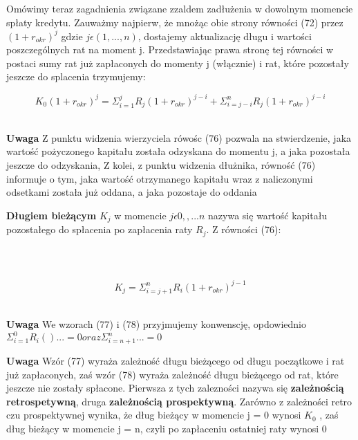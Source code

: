 \documentclass{article}
\begin{document}
Omówimy teraz zagadnienia związane  zzaldem zadłużenia w dowolnym momencie spłaty kredytu. Zauważmy najpierw, że mnożąc obie strony równości (72) przez $ (1 + r_{okr})^j $ gdzie $ j \epsilon (1,...,n) $, dostajemy aktualizację długu i wartości poszczególnych rat na moment j. Przedstawiając prawa stronę tej równości w postaci sumy rat już zapłaconych do momenty j (włącznie) i rat, które pozostały jeszcze do splacenia trzymujemy:

\begin{center}
	\begin{equation}
		K_0(1 + r_{okr})^j = \Sigma ^j_{i=1}R_j(1 + r_{okr})^{j-i} + \Sigma ^n_{i=j-i}R_j(1 + r_{okr})^{j-i}
	\end{equation}
\end{center}\\

\textbf{Uwaga} Z punktu widzenia wierzyciela rówośc (76) pozwala na stwierdzenie, jaka wartość pożyczonego kapitału została odzyskana do momentu j, a jaka pozostała jeszcze do odzyskania, Z kolei, z punktu widzenia dłużnika, równość (76) informuje o tym, jaka wartość otrzymanego kapitału wraz z naliczonymi odsetkami została już oddana, a jaka pozostaje do oddania

\textbf{Długiem bieżącym} $ K_j $ w momencie $ j \epsilon {0,,...n} $ nazywa się wartość kapitału pozostałego do spłacenia po zapłacenia raty $ R_j $. Z równości (76):


\begin{center}
	\begin{equation}

	\end{equation}
\end{center}\\

\begin{center}
	\begin{equation}
		K_j = \Sigma ^n_{i=j+1} R_i(1 + r_{okr})^{j-1}
	\end{equation}
\end{center}\\

\textbf{Uwaga} We wzorach (77) i (78) przyjmujemy konwenscję, opdowiednio\\

$ \Sigma ^0_{i=1} R_i()... = 0 oraz \Sigma ^n_{i=n+1}... = 0 $

\textbf{Uwaga} Wzór (77) wyraża zależność długu bieżącego od długu początkowe i rat już zapłaconych, zaś wzór (78) wyraża zależność długu bieżącego od rat, które jeszcze nie zostały spłacone. Pierwsza z tych zalezności nazywa się \textbf{zależnością retrospetywną},  druga \textbf{zależnością prospektywną}. Zarówno z zależności retro czu prospektywnej wynika, że dług bieżący w momencie j = 0 wynosi $ K_0 $ , zaś dług bieżący w momencie j = n, czyli po zapłaceniu ostatniej raty wynosi 0
\end{document}
